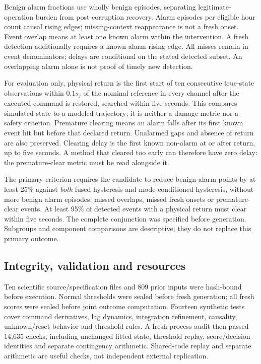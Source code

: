 Benign alarm fractions use wholly benign episodes, separating legitimate-operation burden from post-corruption recovery. Alarm episodes per eligible hour count causal rising edges; missing-context reappearance is not a fresh onset. Event overlap means at least one known alarm within the intervention. A fresh detection additionally requires a known alarm rising edge. All misses remain in event denominators; delays are conditional on the stated detected subset. An overlapping alarm alone is not proof of timely new detection.

For evaluation only, physical return is the first start of ten consecutive true-state observations within $0.1s_j$ of the nominal reference in every channel after the executed command is restored, searched within five seconds. This compares simulated state to a modeled trajectory; it is neither a damage metric nor a safety criterion. Premature clearing means an alarm falls after its first known event hit but before that declared return. Unalarmed gaps and absence of return are also preserved. Clearing delay is the first known non-alarm at or after return, up to five seconds. A method that cleared too early can therefore have zero delay: the premature-clear metric must be read alongside it.

The primary criterion requires the candidate to reduce benign alarm points by at least 25\% against \emph{both} fused hysteresis and mode-conditioned hysteresis, without more benign alarm episodes, missed overlaps, missed fresh onsets or premature-clear events. At least 95\% of detected events with a physical return must clear within five seconds. The complete conjunction was specified before generation. Subgroups and component comparisons are descriptive; they do not replace this primary outcome.

\subsection{Integrity, validation and resources}
Ten scientific source/specification files and 809 prior inputs were hash-bound before execution. Normal thresholds were sealed before fresh generation; all fresh scores were sealed before joint outcome computation. Fourteen synthetic tests cover command derivatives, lag dynamics, integration refinement, causality, unknown/reset behavior and threshold rules. A fresh-process audit then passed 14,635 checks, including unchanged fitted state, threshold replay, score/decision identities and separate contingency arithmetic. Shared-code replay and separate arithmetic are useful checks, not independent external replication.

